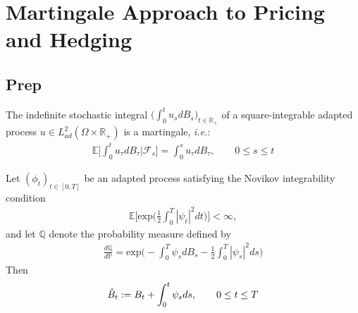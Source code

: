 \documentclass[12pt]{extarticle}
\newcommand{\<}{\langle}
\renewcommand{\>}{\rangle}
\theoremstyle{definition}
\begin{document}
\newpage
\section{Martingale Approach to Pricing and Hedging}
\subsection{Prep}
\begin{tcolorbox}[enhanced, drop fuzzy shadow, title=Proposition 7.1]
The indefinite stochastic integral $\Big(\int^t_0 u_s dB_s\Big)_{t\in \mathbb{R}_+}$ of a square-integrable adapted process $u\in L^2_{ad}(\Omega \times \mathbb{R}_+)$ is a martingale, \textit{i.e.}:
\begin{align*}
    \mathbb{E}\bigg[\int^t_0 u_\tau dB_\tau \bigg|\mathcal{F}_s \bigg] = \int^s_0 u_\tau dB_\tau, \qquad 0\leq s \leq t
\end{align*}
\end{tcolorbox}

\begin{tcolorbox}[enhanced, drop fuzzy shadow, title=Theorem 7.2; Girsanov Theorem]
Let $(\phi_t)_{t\in [0,T]}$ be an adapted process satisfying the Novikov integrability condition
\begin{align*}
    \mathbb{E}\bigg[\text{exp}\bigg( \frac{1}{2} \int^T_0 |\psi_t|^2 dt\bigg) \bigg] < \infty,
\end{align*}
and let $\mathbb{Q}$ denote the probability measure defined by
\begin{align*}
    \frac{d\mathbb{Q}}{d\mathbb{P}} = \text{exp}\bigg(-\int^T_0 \psi_s dB_s -\frac{1}{2}\int^T_0 |\psi_s|^2 ds \bigg)
\end{align*}
Then
\begin{align*}
    \Hat{B}_t := B_t + \int^t_0 \psi_s ds, \qquad 0\leq t \leq T
\end{align*}
\end{tcolorbox}

\newpage
\end{document}
